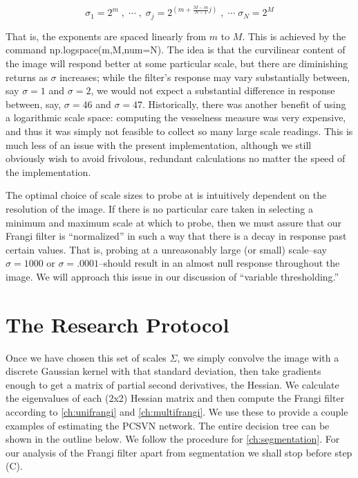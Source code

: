     \begin{equation}
    \sigma_1 = 2^{m} \; , \; \cdots \; , \; \sigma_{j} = 2^{\left(m+\frac{M-m}{N-1}j\right)} \; , \; \cdots \; \sigma_N = 2^{M} \end{equation}
    
    That is, the exponents are spaced linearly from $m$ to $M$. This is achieved by the command
    \textrm{np.logspace(m,M,num=N)}. The idea is that the curvilinear content of the image will respond better at some particular scale, but there are diminishing returns as $\sigma$ increases; while the filter's response may vary substantially between, say $\sigma=1$ and $\sigma=2$, we would not expect a substantial difference in response between, say, $\sigma=46$ and $\sigma=47$. Historically, there was another benefit of using a logarithmic scale space: computing the vesselness measure was very expensive, and thus it was simply not feasible to collect so many large scale readings. This is much less of an issue with the present implementation, although we still obviously wish to avoid frivolous, redundant calculations no matter the speed of the implementation.
    
    The optimal choice of scale sizes to probe at is intuitively dependent on the resolution of the image. If there is no particular care taken in selecting a minimum and maximum scale at which to probe, then we must assure that our Frangi filter is ``normalized'' in such a way that there is a decay in response past certain values. That is, probing at a unreasonably large (or small) scale--say $\sigma=1000$ or $\sigma=.0001$--should result in an almost null response throughout the image. We will approach this issue in our discussion of ``variable thresholding.'' 
    
    \section{The Research Protocol}
    Once we have chosen this set of scales $\Sigma$, we simply convolve the image with a discrete Gaussian kernel with that standard deviation, then take gradients enough to get a matrix of partial second derivatives, the Hessian. We calculate the eigenvalues of each (2x2) Hessian matrix and then compute the Frangi filter according to \cref{ch:unifrangi} and \cref{ch:multifrangi}. We use these to provide a couple examples of estimating the PCSVN network. The entire decision tree can be shown in the outline below. We follow the procedure for \cref{ch:segmentation}. For our analysis of the Frangi filter apart from segmentation we shall stop before step (C).
    
